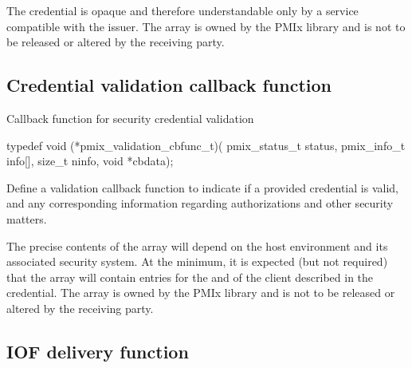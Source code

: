 \adviceuserstart
The credential is opaque and therefore understandable only by a service compatible with the issuer. The  array is owned by the \ac{PMIx} library and is not to be released or altered by the receiving party.
\adviceuserend

\subsection{Credential validation callback function}

\summary

Callback function for security credential validation

\format

\cspecificstart
\begin{codepar}
typedef void (*pmix_validation_cbfunc_t)(
                             pmix_status_t status,
                             pmix_info_t info[], size_t ninfo,
                             void *cbdata);
\end{codepar}
\cspecificend

\begin{arglist}
\end{arglist}

\descr

Define a validation callback function to indicate if a provided credential is valid, and any corresponding information regarding authorizations and other security matters.

\adviceuserstart
The precise contents of the array will depend on the host environment and its associated security system. At the minimum, it is expected (but not required) that the array will contain entries for the  and  of the client described in the credential. The  array is owned by the \ac{PMIx} library and is not to be released or altered by the receiving party.
\adviceuserend

\subsection{IOF delivery function}

